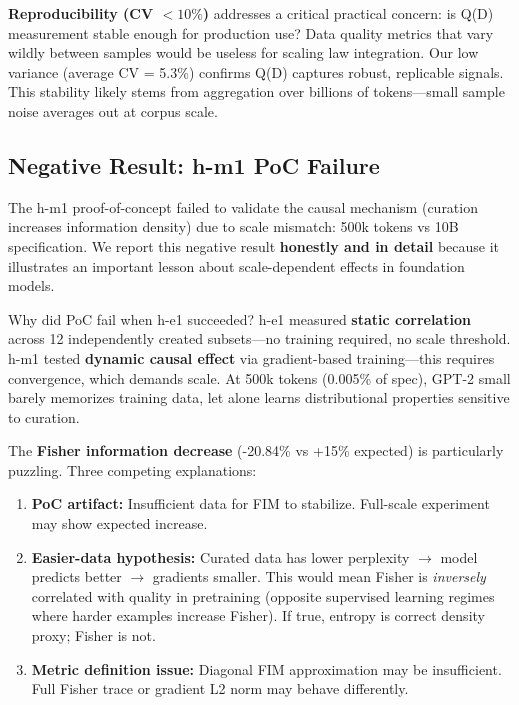 \textbf{Reproducibility (CV $< 10\%$)} addresses a critical practical concern: is Q(D) measurement stable enough for production use? Data quality metrics that vary wildly between samples would be useless for scaling law integration. Our low variance (average CV = 5.3\%) confirms Q(D) captures robust, replicable signals. This stability likely stems from aggregation over billions of tokens---small sample noise averages out at corpus scale.

\subsection{Negative Result: h-m1 PoC Failure}

The h-m1 proof-of-concept failed to validate the causal mechanism (curation increases information density) due to scale mismatch: 500k tokens vs 10B specification. We report this negative result \textbf{honestly and in detail} because it illustrates an important lesson about scale-dependent effects in foundation models.

Why did PoC fail when h-e1 succeeded? h-e1 measured \textbf{static correlation} across 12 independently created subsets---no training required, no scale threshold. h-m1 tested \textbf{dynamic causal effect} via gradient-based training---this requires convergence, which demands scale. At 500k tokens (0.005\% of spec), GPT-2 small barely memorizes training data, let alone learns distributional properties sensitive to curation.

The \textbf{Fisher information decrease} (-20.84\% vs +15\% expected) is particularly puzzling. Three competing explanations:

\begin{enumerate}
\item \textbf{PoC artifact:} Insufficient data for FIM to stabilize. Full-scale experiment may show expected increase.
\item \textbf{Easier-data hypothesis:} Curated data has lower perplexity $\rightarrow$ model predicts better $\rightarrow$ gradients smaller. This would mean Fisher is \textit{inversely} correlated with quality in pretraining (opposite supervised learning regimes where harder examples increase Fisher). If true, entropy is correct density proxy; Fisher is not.
\item \textbf{Metric definition issue:} Diagonal FIM approximation may be insufficient. Full Fisher trace or gradient L2 norm may behave differently.
\end{enumerate}

